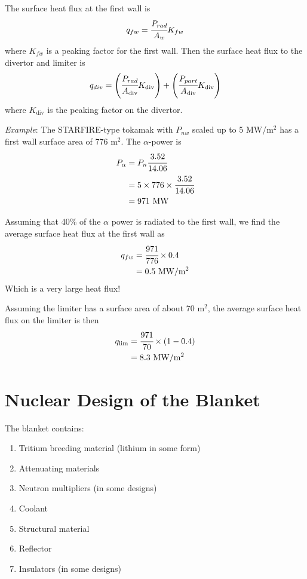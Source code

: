 \documentclass[11pt]{report} %
\begin{document}
The surface heat flux at the first wall is
\begin{equation}
q_{fw} = \cfrac{P_{rad}}{A_w}K_{fw}
\end{equation}
where $K_{fw}$ is a peaking factor for the first wall. Then the surface heat flux to the divertor and limiter is
\begin{equation}
q_{div} = \left( \cfrac{P_{rad}}{A_\text{div}}K_{\text{div}}\right) + \left( \cfrac{P_{part}}{A_\text{div}}K_{\text{div}}\right)
\end{equation}
where $K_\text{div}$ is the peaking factor on the divertor.

{\it Example}:
The STARFIRE-type tokamak with $P_{nw}$ scaled up to 5 MW/m$^2$ has a first wall surface area of 776 m$^2$. The $\alpha$-power is
\begin{align*}
P_\alpha &= P_n \cfrac{3.52}{14.06}\\
& = 5 \times 776 \times \cfrac{3.52}{14.06}\\
& = 971~\text{MW}
\end{align*}

Assuming that 40\% of the $\alpha$ power is radiated to the first wall, we find the average surface heat flux at the first wall as
\begin{align*}
q_{fw} &= \cfrac{971}{776}\times 0.4\\
& = 0.5~\text{MW/m$^2$}
\end{align*}
Which is a very large heat flux! 

Assuming the limiter has a surface area of about 70 m$^2$, the average surface heat flux on the limiter is then
\begin{align*}
q_\text{lim} &= \cfrac{971}{70}\times (1-0.4)\\
& = 8.3~\text{MW/m$^2$}
\end{align*}



\chapter{Nuclear Design of the Blanket}
\label{blanketDesign}
The blanket contains:
\begin{enumerate}
\item Tritium breeding material (lithium in some form)
\item Attenuating materials
\item Neutron multipliers (in some designs)
\item Coolant
\item Structural material
\item Reflector
\item Insulators (in some designs)
\end{enumerate}
\end{document}
